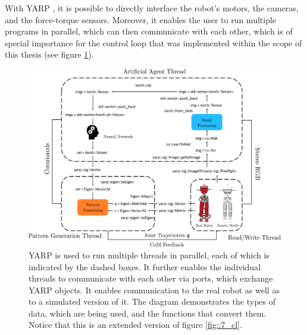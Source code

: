\label{sec::8_co}
With YARP \cite{metta2006yarp}, it is possible to directly interface the robot's motors, the cameras, and the force-torque sensors. Moreover, it enables the user to run multiple programs in parallel, which can then communicate with each other, which is of special importance for the control loop that was implemented within the scope of this thesis (see figure \ref{fig::341_yarp}).
\begin{figure}[h!]
	\hspace*{-1cm}
	\includegraphics[scale=.4]{chapters/06_implementation_of_the_walking_pattern_generator/img/yarp_diag.png}
	\caption{YARP is used to run multiple threads in parallel, each of which is indicated by the dashed boxes. It further enables the individual threads to communicate with each other via ports, which exchange YARP objects. It enables communication to the real robot as well as to a simulated version of it. The diagram demonstrates the types of data, which are being used, and the functions that convert them. Notice that this is an extended version of figure \ref{fig::7_cl}.}
	\label{fig::341_yarp}
\end{figure}
